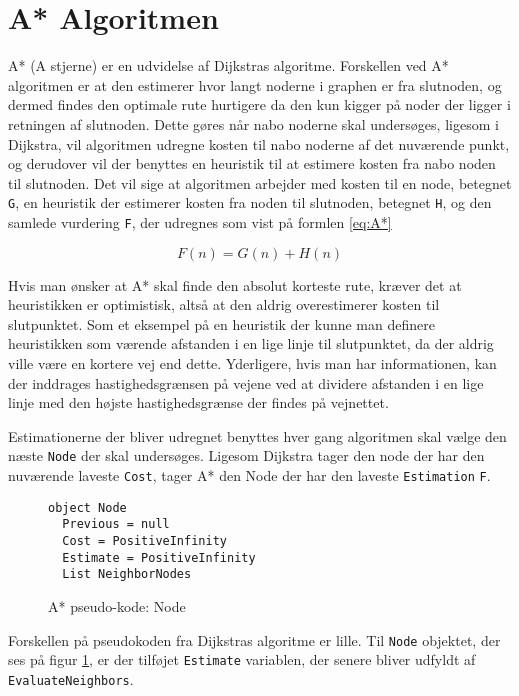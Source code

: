 \section{A* Algoritmen}
A* (A stjerne) er en udvidelse af Dijkstras algoritme. Forskellen ved A* algoritmen er at den estimerer hvor langt noderne i graphen er fra slutnoden, og dermed findes den optimale rute hurtigere da den kun kigger på noder der ligger i retningen af slutnoden. Dette gøres når nabo noderne skal undersøges, ligesom i Dijkstra, vil algoritmen udregne kosten til nabo noderne af det nuværende punkt, og derudover vil der benyttes en heuristik til at estimere kosten fra nabo noden til slutnoden. Det vil sige at algoritmen arbejder med kosten til en node, betegnet \texttt{G}, en heuristik der estimerer kosten fra noden til slutnoden, betegnet \texttt{H}, og den samlede vurdering \texttt{F}, der udregnes som vist på formlen \ref{eq:A*}

\begin{equation} \label{eq:A*}
F(n) = G(n) + H(n)
\end{equation}
\vspace{5mm}

Hvis man ønsker at A* skal finde den absolut korteste rute, kræver det at heuristikken er optimistisk, altså at den aldrig overestimerer kosten til slutpunktet. Som et eksempel på en heuristik der kunne man definere heuristikken som værende afstanden i en lige linje til slutpunktet, da der aldrig ville være en kortere vej end dette. Yderligere, hvis man har informationen, kan der inddrages hastighedsgrænsen på vejene ved at dividere afstanden i en lige linje med den højste hastighedsgrænse der findes på vejnettet.

\vspace{5mm}

Estimationerne der bliver udregnet benyttes hver gang algoritmen skal vælge den næste \texttt{Node} der skal undersøges. Ligesom Dijkstra tager den node der har den nuværende laveste \texttt{Cost}, tager A* den Node der har den laveste \texttt{Estimation} \texttt{F}.

\begin{figure}[H]
\begin{lstlisting}
object Node
  Previous = null
  Cost = PositiveInfinity
  Estimate = PositiveInfinity
  List NeighborNodes
\end{lstlisting}
\caption{A* pseudo-kode: Node}\label{AStarCodeNode}
\end{figure}

Forskellen på pseudokoden fra Dijkstras algoritme er lille. Til \texttt{Node} objektet, der ses på figur \ref{AStarCodeNode}, er der tilføjet \texttt{Estimate} variablen, der senere bliver udfyldt af \texttt{EvaluateNeighbors}.


